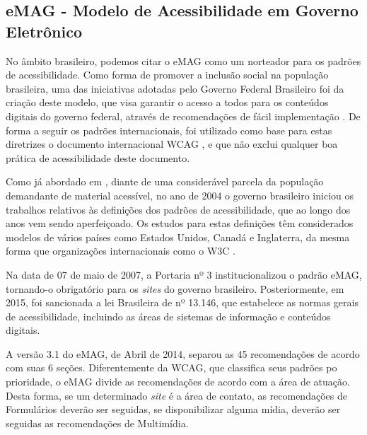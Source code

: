 \documentclass[
	12pt,				%
	oneside,			%
	a4paper,			%
	english,			%
	brazil				%
	]{abntex2ppgsi}
\begin{document}
\subsection{eMAG - Modelo de Acessibilidade em Governo Eletrônico \cite{emag}}
No âmbito brasileiro, podemos citar o eMAG como um norteador para os padrões de acessibilidade. Como forma de promover a inclusão social na população brasileira, uma das iniciativas adotadas pelo Governo Federal Brasileiro foi da criação deste modelo, que visa garantir o acesso a todos para os conteúdos digitais do governo federal, através de recomendações de fácil implementação \cite{victormaster}.
De forma a seguir os padrões internacionais, foi utilizado como base para estas diretrizes o documento internacional WCAG \cite{wcag}, e que não exclui qualquer boa prática de acessibilidade deste documento.

Como já abordado em \cite{victormaster}, diante de uma considerável parcela da população demandante de material acessível, no ano de 2004 o governo brasileiro iniciou os trabalhos relativos às definições dos padrões de acessibilidade, que ao longo dos anos vem sendo aperfeiçoado. Os estudos para estas definições têm considerados modelos de vários países como Estados Unidos, Canadá e Inglaterra, da mesma forma que organizações internacionais como o W3C \cite{wai}.

Na data de 07 de maio de 2007, a Portaria nº 3 institucionalizou o padrão eMAG, tornando-o obrigatório para os \textit{sites} do governo brasileiro. Posteriormente, em 2015, foi sancionada a lei Brasileira de nº 13.146, que estabelece as normas gerais de acessibilidade, incluindo as áreas de sistemas de informação e conteúdos digitais.

A versão 3.1 do eMAG, de Abril de 2014, separou as 45 recomendações de acordo com suas 6 seções. Diferentemente da WCAG, que classifica seus padrões po prioridade, o eMAG divide as recomendações de acordo com a área de atuação. Desta forma, se um determinado \textit{site} é a área de contato, as recomendações de Formulários deverão ser seguidas, se disponibilizar alguma mídia, deverão ser seguidas as recomendações de Multimídia.
\end{document}
